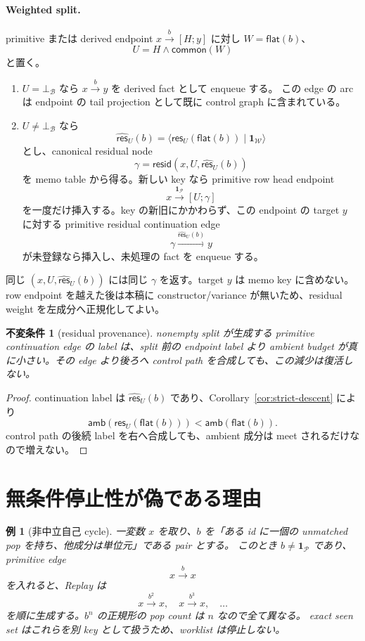\documentclass[uplatex,dvipdfmx,a4paper,10.5pt]{jsarticle}
\theoremstyle{jpplain}
\newtheorem{invariant}[definition]{不変条件}
\newtheorem{example}[definition]{例}
\newcommand{\Caps}{\mathcal B}
\newcommand{\botc}{\bot_{\Caps}}
\newcommand{\meet}{\mathbin{\wedge}}
\newcommand{\Weight}{\mathcal W}
\newcommand{\Pair}{\mathcal P}
\newcommand{\idw}{\mathbf 1_{\Weight}}
\newcommand{\idp}{\mathbf 1_{\Pair}}
\newcommand{\flatten}{\mathsf{flat}}
\newcommand{\amb}{\mathsf{amb}}
\newcommand{\common}{\mathsf{common}}
\newcommand{\res}{\mathsf{res}}
\newcommand{\respair}{\widehat{\mathsf{res}}}
\newcommand{\edge}[3]{#1\xrightarrow{#2}#3}
\newcommand{\epedge}[4]{#1\xrightarrow{#2}[#3;#4]}
\newcommand{\rid}{\mathsf{resid}}
\begin{document}
\paragraph{Weighted split.}
primitive または derived endpoint $\epedge{x}{b}{H}{y}$ に対し
$W=\flatten(b)$、
\[
  U=H\meet\common(W)
\]
と置く。

\begin{enumerate}
  \item $U=\botc$ なら $\edge{x}{b}{y}$ を derived fact として enqueue する。
  この edge の arc は endpoint の tail projection として既に control graph に含まれている。
  \item $U\neq\botc$ なら
  \[
    \respair_U(b)=\langle\res_U(\flatten(b))\mid\idw\rangle
  \]
  とし、canonical residual node
  \[
    \gamma=\rid(x,U,\respair_U(b))
  \]
  を memo table から得る。新しい key なら primitive row head endpoint
  \[
    \epedge{x}{\idp}{U}{\gamma}
  \]
  を一度だけ挿入する。key の新旧にかかわらず、この endpoint の target $y$ に対する primitive residual continuation edge
  \[
    \edge{\gamma}{\respair_U(b)}{y}
  \]
  が未登録なら挿入し、未処理の fact を enqueue する。
\end{enumerate}

同じ $(x,U,\respair_U(b))$ には同じ $\gamma$ を返す。target $y$ は memo key に含めない。
row endpoint を越えた後は本稿に constructor/variance が無いため、residual weight を左成分へ正規化してよい。

\begin{invariant}[residual provenance]
nonempty split が生成する primitive continuation edge の label は、split 前の endpoint label より
ambient budget が真に小さい。その edge より後ろへ control path を合成しても、この減少は復活しない。
\end{invariant}

\begin{proof}
continuation label は $\respair_U(b)$ であり、Corollary~\ref{cor:strict-descent} により
\[
  \amb(\res_U(\flatten(b)))<\amb(\flatten(b)).
\]
control path の後続 label を右へ合成しても、ambient 成分は meet されるだけなので増えない。
\end{proof}

\section{無条件停止性が偽である理由}

\begin{example}[非中立自己 cycle]
一変数 $x$ を取り、$b$ を「ある id に一個の unmatched pop を持ち、他成分は単位元」である pair とする。
このとき $b\neq\idp$ であり、primitive edge
\[
  \edge{x}{b}{x}
\]
を入れると、Replay は
\[
  \edge{x}{b^2}{x},\quad
  \edge{x}{b^3}{x},\quad\ldots
\]
を順に生成する。$b^n$ の正規形の pop count は $n$ なので全て異なる。
exact seen set はこれらを別 key として扱うため、worklist は停止しない。
\end{example}
\end{document}

